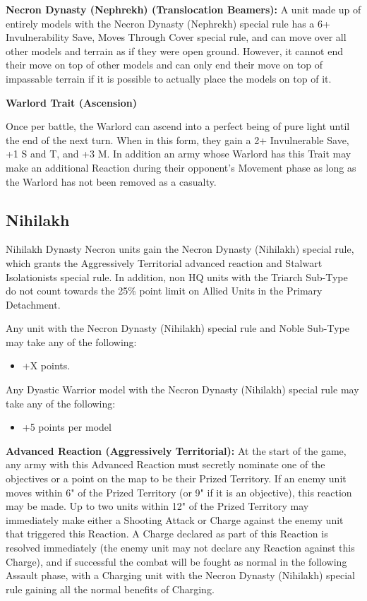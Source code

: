 \begin{multicols}{2}
\textbf{Necron Dynasty (Nephrekh) (Translocation Beamers):} A unit made up of entirely models with the Necron Dynasty (Nephrekh) special rule has a 6+ Invulnerability Save, Moves Through Cover special rule, and can move over all other models and terrain as if they were open ground. However, it cannot end their move on top of other models and can only end their move on top of impassable terrain if it is possible to actually place the models on top of it.	

\textbf{Warlord Trait (Ascension)} 

Once per battle, the Warlord can ascend into a perfect being of pure light until the end of the next turn. When in this form, they gain a 2+ Invulnerable Save, +1 S and T, and +3 M. In addition an army whose Warlord has this Trait may make an additional Reaction during their opponent’s Movement phase as long as the Warlord has not been removed as a casualty.

\newpage
\subsection{Nihilakh}

Nihilakh Dynasty Necron units gain the Necron Dynasty (Nihilakh) special rule, which grants the Aggressively Territorial advanced reaction and Stalwart Isolationists special rule. In addition, non HQ units with the Triarch Sub-Type do not count towards the 25\% point limit on Allied Units in the Primary Detachment.

Any unit with the Necron Dynasty (Nihilakh) special rule and Noble Sub-Type may take any of the following:
\begin{itemize}
	\item {} \dotfill +X points.
\end{itemize}
Any Dyastic Warrior model with the Necron Dynasty (Nihilakh) special rule may take any of the following:
\begin{itemize}
\item {} \dotfill +5 points per model
\end{itemize}

\textbf{Advanced Reaction (Aggressively Territorial):} At the start of the game, any army with this Advanced Reaction must secretly nominate one of the objectives or a point on the map to be their Prized Territory. If an enemy unit moves within 6" of the Prized Territory (or 9" if it is an objective), this reaction may be made. Up to two units within 12" of the Prized Territory may immediately make either a Shooting Attack or Charge against the enemy unit that triggered this Reaction. A Charge declared as part of this Reaction is resolved immediately (the enemy unit may not declare any Reaction against this Charge), and if successful the combat will be fought as normal in the following Assault phase, with a Charging unit with the Necron Dynasty (Nihilakh) special rule gaining all the normal benefits of Charging.


\end{multicols}
